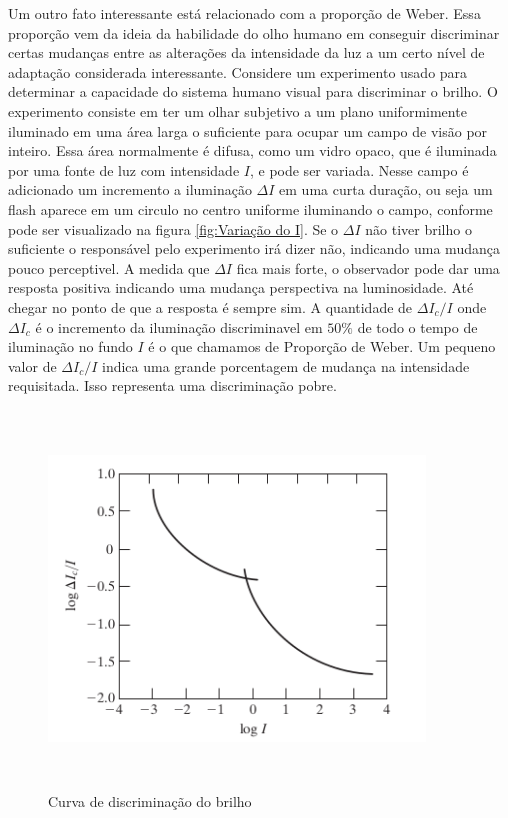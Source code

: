 \documentclass[12pt]{article}
\begin{document}
    Um outro fato interessante está relacionado com a proporção de Weber. Essa proporção vem da ideia
    da habilidade do olho humano em conseguir discriminar certas mudanças entre as alterações
    da intensidade da luz a um certo nível de adaptação considerada interessante.
    Considere um experimento usado para determinar a capacidade do sistema humano visual para discriminar
    o brilho. O experimento consiste em ter um olhar subjetivo a um plano uniformimente iluminado em uma área
    larga o suficiente para ocupar um campo de visão por inteiro. Essa área normalmente é difusa, como um vidro opaco, que
    é iluminada por uma fonte de luz com intensidade $I$, e pode ser variada. Nesse campo é adicionado um incremento a iluminação
    $\varDelta I$ em uma curta duração, ou seja um flash aparece em um circulo no centro uniforme iluminando o campo, conforme
    pode ser visualizado na figura \ref{fig:Variação do I}.
    Se o $\varDelta I$ não tiver brilho o suficiente o responsável pelo experimento irá dizer não, indicando uma mudança pouco
    perceptivel. A medida que $\varDelta I$ fica mais forte, o observador pode dar uma resposta positiva indicando uma mudança perspectiva na luminosidade. Até
    chegar no ponto de que a resposta é sempre sim. A quantidade de $\varDelta I_{c}/I$ onde $\varDelta I_{c}$ é o incremento da iluminação discriminavel em $50\%$ de todo o tempo
    de iluminação no fundo $I$ é o que chamamos de Proporção de Weber. Um pequeno valor de $\varDelta I_{c}/I$ indica uma grande porcentagem de mudança na intensidade requisitada.
    Isso representa uma discriminação pobre.
    \begin{figure}[H]
        \centering
        \includegraphics[width=10cm,height=10cm]{images/10.png}
        \caption{Curva de discriminação do brilho}
        \label{fig:Curv}
    \end{figure}
\end{document}
